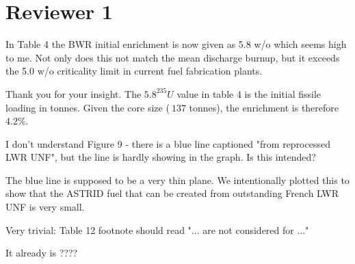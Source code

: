 \documentclass[answers,11pt]{exam}
\begin{document}
\section*{Reviewer 1}
\begin{questions}
    \question In Table 4 the BWR initial enrichment is now given as 5.8 w/o which seems high to me. Not only does this not match the mean discharge burnup, but it exceeds the 5.0 w/o criticality limit in current fuel fabrication plants. 

    \begin{solution}
    Thank you for your insight. The $5.8 ^{235}U$ value in table 4
    is the initial fissile loading in tonnes. Given the core size
    ($~137$ tonnes), the enrichment is therefore $4.2\%$.
    \end{solution}


    \question I don't understand Figure 9 - there is a blue line captioned "from reprocessed LWR UNF", but the line is hardly showing in the graph. Is this intended?

    \begin{solution}
    The blue line is supposed to be a very thin plane. We intentionally
    plotted this to show that the ASTRID fuel that can be created
    from outstanding French \gls{LWR} \gls{UNF} is very small.
    \end{solution}

    \question Very trivial: Table 12 footnote should read "... are not considered for ..."

    \begin{solution}
    It already is ????
    \end{solution}


\end{questions}
\end{document}
